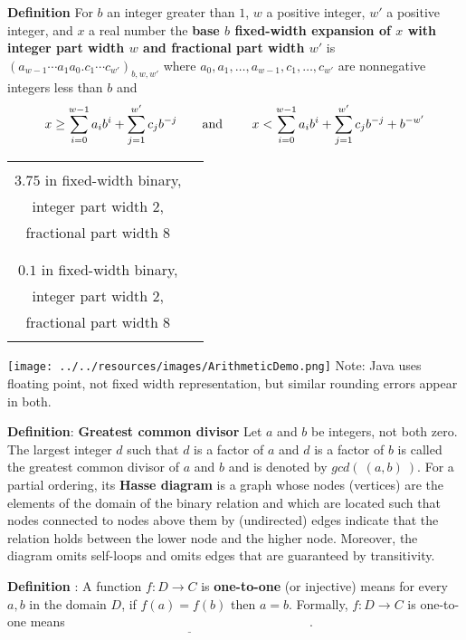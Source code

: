 \documentclass[12pt, oneside]{article}
\begin{document}
{\bf Definition} For $b$ an integer greater than $1$, $w$ a positive integer, 
$w'$ a positive  integer, and $x$ a real number the {\bf base $b$ fixed-width 
expansion of $x$ with integer part width $w$  and fractional part width $w'$} is
$(a_{w-1} \cdots a_1 a_0 .  c_{1} \cdots c_{w'})_{b,w,w'}$
where  $a_0, a_1, \ldots, a_{w-1}, c_1, \ldots, c_{w'}$ are nonnegative integers less than $b$ and
$$x \geq \sum_{i=0}^{w-1} a_{i} b^{i} + \sum_{j=1}^{w'}  c_{j} b^{-j} \hfill
\textrm{\qquad and \qquad}
\hfill x < \sum_{i=0}^{w-1} a_{i} b^{i} + \sum_{j=1}^{w'} c_{j} b^{-j} + b^{-w'}$$
\begin{center}
\begin{tabular}{|c|p{5in}|}
\hline
& \\
$3.75$  in fixed-width binary,& \\
integer part width $2$,&\\
 fractional part width $8$ & \\
& \\
\hline
& \\
$0.1$  in fixed-width binary, & \\
integer part width $2$, &\\
 fractional part width $8$ & \\
& \\
\hline
\end{tabular}
\end{center}
\texttt{[image: ../../resources/images/ArithmeticDemo.png]}
Note: Java uses floating point, not fixed width representation, but similar rounding errors appear in both.

{\bf Definition}: {\bf Greatest common divisor} Let $a$ and $b$ be integers, not both zero. The largest integer $d$ such that 
$d$ is a  factor of $a$ and $d$ is a factor of  $b$ is called the greatest common divisor of $a$ and $b$ 
and is denoted by $gcd(~(a, b)~)$.
For a partial ordering, its {\bf Hasse diagram} is a graph whose nodes (vertices) are the elements of the 
domain of the binary relation and which are located such that nodes connected to nodes
above them by (undirected) edges indicate that the relation holds between the lower node and the higher node. 
Moreover, the diagram omits self-loops and omits edges that are guaranteed by transitivity.

{\bf Definition} : A function $f: D  \to C$ is {\bf one-to-one} (or  injective) 
means for every $a,b$ in the domain $D$, 
if $f(a) = f(b)$ then  $a=b$.
Formally, $f: D  \to  C$ is  one-to-one  means $\underline{\phantom{\forall a \in D \forall b \in D ~(f(a) = f(b) \to a = b)}}$.
\end{document}
